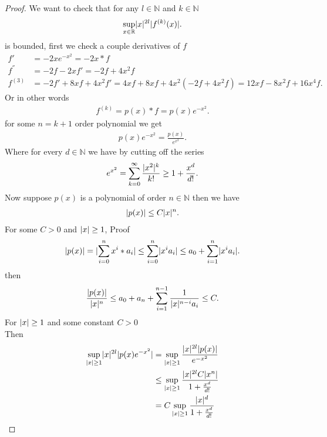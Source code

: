 \begin{proof}
 We want to check that for any $l \in  \mathbb{N}$ and $k \in  \mathbb{N}$ 
 \begin{align*}
   \sup_{x \in  \mathbb{R}} \lvert x\rvert^{2l} \lvert f^{(k)}(x) \rvert 
 .\end{align*}
 is bounded, first we check a couple derivatives of $f$
 \begin{align*}
   f' &=  -2xe^{-x^2}   = -2x*f\\
   f^{''} &= -2f - 2xf' =  -2f +4x^2 f \\
   f^{(3)} &= -2f' + 8xf + 4x^2f' = 4xf + 8xf + 4x^2(-2f + 4x^2f)  = 12xf -8x^2f + 16x^{4}f 
 .\end{align*}
Or in other words
\begin{align*}
  f^{(k)} = p(x)*f = p(x)e^{-x^2} 
.\end{align*}
for some $n=k+1$ order polynomial we get 
\begin{align*}
  p(x)e^{-x^2} = \frac{p(x)}{e^{x^2} } 
.\end{align*}
Where for every $d \in  \mathbb{N}$ we have by cutting off the series
\begin{align*}
  e^{x^2} = \sum_{k=0}^{\infty} \frac{\lvert x^2\rvert^{k} }{k!} \ge  1 + \frac{x^{d}}{d!}
.\end{align*}
Now suppose $p(x)$ is a polynomial of order $n \in  \mathbb{N}$ then we have 
\begin{align*}
  \lvert p(x)\rvert \le C \lvert x\rvert^{n} 
.\end{align*}
For some $C > 0$  and $\lvert x\rvert \ge 1$, Proof
\begin{align*}
  \lvert p(x)\rvert = \lvert\sum_{i=0}^{n}  x^{i}*a_i\rvert \le  \sum_{i=0}^{n} \lvert x^{i} a_i\rvert \le  a_0 + \sum_{i=1}^{n} \lvert x^{i} a_i\rvert 
.\end{align*}
then 
\begin{align*}
  \frac{\lvert p(x)\rvert}{\lvert x\rvert^{n} } \le  a_0 + a_n + \sum_{i=1}^{n-1} \frac{1}{\lvert x\rvert^{n-i}a_i}   \le  C
.\end{align*}
For $\lvert x\rvert \ge  1$ and some constant $C>0$ \\[1ex]
Then 
\begin{align*}
  \sup_{\abs{x}\ge 1} \abs{x}^{2l}\abs{p(x)e^{-x^2} } &= \sup_{\abs{x}\ge 1} \frac{\abs{x}^{2l}\abs{p(x)} }{e^{-x^2} } \\
                                                          &\le  \sup_{\abs{x}\ge 1} \frac{\abs{x}^{2l}C\abs{x^{n} } }{1+\frac{x^{d}}{d!} }\\
                                                          &=  C\sup_{\abs{x}\ge 1} \frac{\abs{x}^{d} }{1+\frac{x^{d}}{d!} }\\

\end{align*}
\end{proof}

